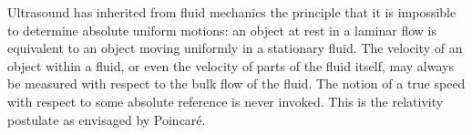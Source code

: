 \documentclass[10pt, fleqn,final,showtrims,oldfontcommands, article,a4paper,oneside]{memoir} %
\newcommand{\secref}[1]{section~\ref{sec:#1}}
\newcommand{\Poincare}{Poincar{\'e}\xspace}
\begin{document}
Ultrasound has inherited from fluid mechanics the principle that it is impossible to determine absolute uniform motions:
an object at rest in a laminar flow is equivalent to an object moving uniformly in a stationary fluid.
The velocity of an object within a fluid, or even the velocity of parts of the fluid itself, may always be measured with respect to the bulk flow of the fluid.
The notion of a true speed with respect to some absolute reference is never  invoked.
This is the relativity postulate as envisaged by \Poincare.



\end{document}
